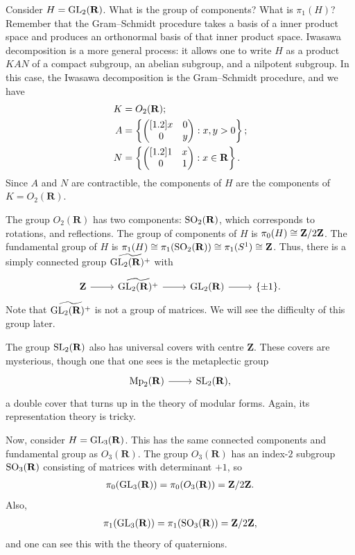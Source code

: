\documentclass [11 pt, twoside] {article}
\begin{document}
\begin{example}[ ]\label{}\text{}
Consider $H=\operatorname{GL}_{2}(\mathbf{R})$. What is the group of components? What is $\pi_1(H)$?
Remember that the Gram--Schmidt procedure takes a basis of a inner product space and produces an orthonormal basis of that inner product space.
Iwasawa decomposition is a more general process: it allows one to write $H$ as a product $KAN$ of a compact subgroup, an abelian subgroup, and a nilpotent subgroup. 
In this case, the Iwasawa decomposition is the Gram--Schmidt procedure, and we have
\begin{align*}
	K &= O_{2}(\mathbf{R}) ;\\
	A &= \left\{ \begin{pmatrix} [1.2] x&0\\0&y\end{pmatrix} : x,y>0 \right\};\\
	N &= \left\{ \begin{pmatrix} [1.2] 1&x\\0&1\end{pmatrix} : x\in \mathbf{R} \right\} . 
\end{align*}
Since $A$ and $N$ are contractible, the components of $H$ are the components of $K = O_{2}(\mathbf{R})$.

The group $O_{2}(\mathbf{R})$ has two components: $\operatorname{SO}_{2}(\mathbf{R})$, which corresponds to rotations, and reflections.
The group of components of $H$ is $\pi_0(H)\cong  \mathbf{Z}/2\mathbf{Z}$.
The fundamental group of $H$ is $\pi_1(H)\cong \pi_1(\operatorname{SO}_{2}(\mathbf{R})) \cong \pi_1(S^{1}) \cong \mathbf{Z}$.
Thus, there is a simply connected group $\widetilde{\operatorname{GL}_{2}(\mathbf{R}) ^{+}}$ with
\[
\begin{tikzcd}
	\mathbf{Z}\ar[r]& \widetilde{\GL_{2}(\mathbf{R}) ^{+}} \ar[r]& \GL_{2}(\mathbf{R})\ar[r]& \{\pm 1\}.
\end{tikzcd}
\]
Note that $\widetilde{\operatorname{GL}_{2}(\mathbf{R}) ^{+}}$ is not a group of matrices.
We will see the difficulty of this group later.

The group $\operatorname{SL}_{2}(\mathbf{R})$ also has universal covers with centre $\mathbf{Z}$. These covers are mysterious, though one that one sees is the metaplectic group
\[
\begin{tikzcd}
	\Mp_{2}(\mathbf{R})\ar[r]& \SL_{2}(\mathbf{R}),
\end{tikzcd}
\]
a double cover that turns up in the theory of modular forms.
Again, its representation theory is tricky. 
\end{example}

\begin{example}[ ]\label{}\text{}
Now, consider $H=\operatorname{GL}_{3}(\mathbf{R})$. This has the same connected components and fundamental group as $O_3(\mathbf{R})$.
The group $O_{3}(\mathbf{R})$ has an index-$2$ subgroup $\operatorname{SO}_{3}(\mathbf{R})$ consisting of matrices with determinant $+1$, so
\begin{align*}
	\pi_0(\operatorname{GL}_{3}(\mathbf{R})) = \pi_{0}(O_{3}(\mathbf{R})) = \mathbf{Z}/2\mathbf{Z}.
\end{align*}
Also,
\begin{align*}
	\pi_1(\operatorname{GL}_{3}(\mathbf{R})) = \pi_1(\operatorname{SO}_{3}(\mathbf{R})) = \mathbf{Z}/2\mathbf{Z}, 
\end{align*}
and one can see this with the theory of quaternions.
\end{example}
\end{document}
